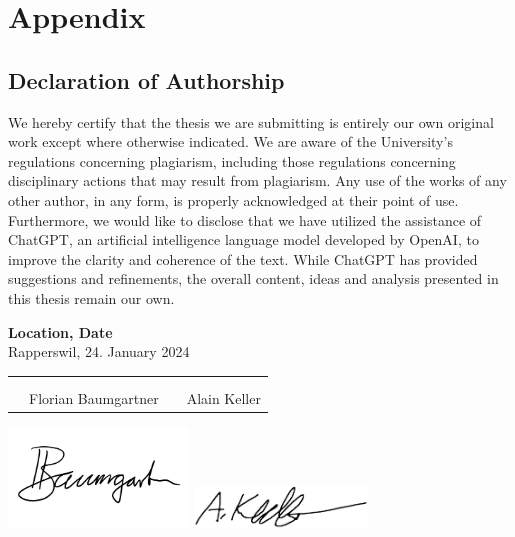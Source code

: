 \chapter{Appendix}
\clearpage

\section{Declaration of Authorship} \label{Declaration of Authorship}
We hereby certify that the thesis we are submitting is entirely our own original work except where otherwise indicated.
We are aware of the University's regulations concerning plagiarism, including those regulations concerning disciplinary actions that may result from plagiarism.
Any use of the works of any other author, in any form, is properly acknowledged at their point of use.
Furthermore, we would like to disclose that we have utilized the assistance of ChatGPT, an artificial intelligence language model developed by OpenAI,
to improve the clarity and coherence of the text. While ChatGPT has provided suggestions and refinements,
the overall content, ideas and analysis presented in this thesis remain our own.

\bigskip
\textbf{Location, Date} \\
Rapperswil, 24. January 2024

\vspace{1.2cm}
\begin{tabular}{@{}p{0.1cm}p{6cm}p{0.6cm}p{6cm}@{}}
	 & \hrulefill          &  & \hrulefill   \\ \\[-0.7em]
	 & Florian Baumgartner &  & Alain Keller \\
\end{tabular}

\includegraphics[width=4.8cm, align=t, smash=br, hshift=0.9cm, vshift=2.55cm]{appendix/Signature_Florian_Baumgartner.pdf}
\includegraphics[width=4.6cm, align=t, smash=br, hshift=8.25cm, vshift=1.95cm]{appendix/Signature_Alain_Keller.png}
\newpage

